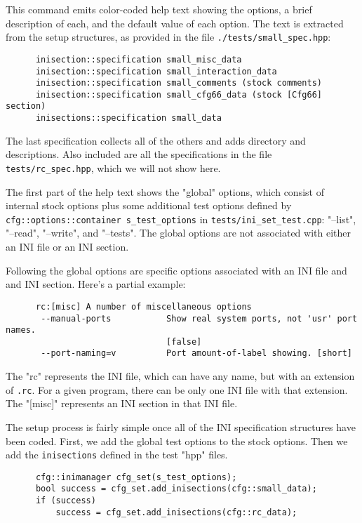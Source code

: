    This command emits color-coded help text showing the options, a brief
   description of each, and the default value of each option.
   The text is extracted from the setup structures, as provided in
   the file \texttt{./tests/small\_spec.hpp}:

   \begin{verbatim}
      inisection::specification small_misc_data
      inisection::specification small_interaction_data
      inisection::specification small_comments (stock comments)
      inisection::specification small_cfg66_data (stock [Cfg66] section)
      inisections::specification small_data
   \end{verbatim}

   The last specification collects all of the others and adds directory and
   descriptions.  Also included are all the specifications in the
   file \texttt{tests/rc\_spec.hpp}, which we will not show here.


   The first part of the help text shows the "global" options, which consist
   of internal stock options plus some additional test options
   defined by \texttt{cfg::options::container s\_test\_options} in
   \texttt{tests/ini\_set\_test.cpp}:
   "--list", "--read", "--write", and "--tests".
   The global options are not associated with either an INI file
   or an INI section.

   Following the global options are specific options associated with an
   INI file and and INI section.  Here's a partial example:

   \begin{verbatim}
      rc:[misc] A number of miscellaneous options
       --manual-ports           Show real system ports, not 'usr' port names.
                                [false]
       --port-naming=v          Port amount-of-label showing. [short]
   \end{verbatim}

   The "rc" represents the INI file, which can have any name, but with an
   extension of \texttt{.rc}.
   For a given program, there can be only one INI file with that extension.
   The "[misc]" represents an INI section in that INI file.

   The setup process is fairly simple once all of the INI specification
   structures have been coded. First, we add the global test options
   to the stock options. Then we add the \texttt{inisections}
   defined in the test "hpp" files.

   \begin{verbatim}
      cfg::inimanager cfg_set(s_test_options);
      bool success = cfg_set.add_inisections(cfg::small_data);
      if (success)
          success = cfg_set.add_inisections(cfg::rc_data);
   \end{verbatim}


